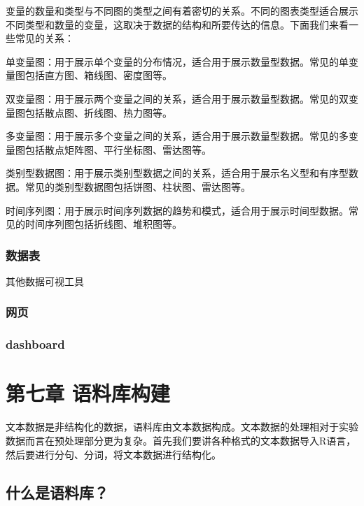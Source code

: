 \documentclass[]{book}
\begin{document}
变量的数量和类型与不同图的类型之间有着密切的关系。不同的图表类型适合展示不同类型和数量的变量，这取决于数据的结构和所要传达的信息。下面我们来看一些常见的关系：

单变量图：用于展示单个变量的分布情况，适合用于展示数量型数据。常见的单变量图包括直方图、箱线图、密度图等。

双变量图：用于展示两个变量之间的关系，适合用于展示数量型数据。常见的双变量图包括散点图、折线图、热力图等。

多变量图：用于展示多个变量之间的关系，适合用于展示数量型数据。常见的多变量图包括散点矩阵图、平行坐标图、雷达图等。

类别型数据图：用于展示类别型数据之间的关系，适合用于展示名义型和有序型数据。常见的类别型数据图包括饼图、柱状图、雷达图等。

时间序列图：用于展示时间序列数据的趋势和模式，适合用于展示时间型数据。常见的时间序列图包括折线图、堆积图等。

\hypertarget{ux6570ux636eux8868}{%
\subsection{数据表}\label{ux6570ux636eux8868}}

其他数据可视工具

\hypertarget{ux7f51ux9875}{%
\subsection{网页}\label{ux7f51ux9875}}

\hypertarget{dashboard}{%
\subsection{dashboard}\label{dashboard}}

\hypertarget{ux7b2cux4e03ux7ae0-ux8bedux6599ux5e93ux6784ux5efa}{%
\chapter{第七章 语料库构建}\label{ux7b2cux4e03ux7ae0-ux8bedux6599ux5e93ux6784ux5efa}}

文本数据是非结构化的数据，语料库由文本数据构成。文本数据的处理相对于实验数据而言在预处理部分更为复杂。首先我们要讲各种格式的文本数据导入R语言，然后要进行分句、分词，将文本数据进行结构化。

\hypertarget{ux4ec0ux4e48ux662fux8bedux6599ux5e93}{%
\section{什么是语料库？}\label{ux4ec0ux4e48ux662fux8bedux6599ux5e93}}
\end{document}
